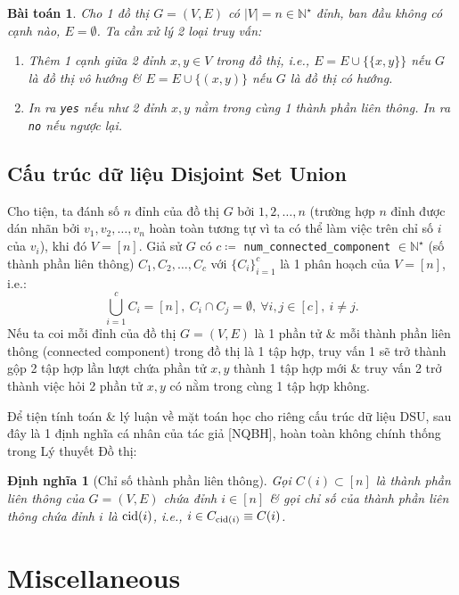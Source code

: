 \documentclass{article}
\newtheorem{baitoan}{Bài toán}
\newtheorem{dinhnghia}{Định nghĩa}
\begin{document}
\begin{baitoan}
    Cho 1 đồ thị $G = (V,E)$ có $|V| = n\in\mathbb{N}^\star$ đỉnh, ban đầu không có cạnh nào, $E = \emptyset$. Ta cần xử lý 2 loại truy vấn:
    \begin{enumerate}
        \item Thêm 1 cạnh giữa 2 đỉnh $x,y\in V$ trong đồ thị, i.e., $E = E\cup\{\{x,y\}\}$ nếu $G$ là đồ thị vô hướng \& $E = E\cup\{(x,y)\}$ nếu $G$ là đồ thị có hướng.
        \item In ra {\tt yes} nếu như 2 đỉnh $x,y$ nằm trong cùng 1 thành phần liên thông. In ra {\tt no} nếu ngược lại.
    \end{enumerate}
\end{baitoan}


\subsection{Cấu trúc dữ liệu Disjoint Set Union}
Cho tiện, ta đánh số $n$ đỉnh của đồ thị $G$ bởi $1,2,\ldots,n$ (trường hợp $n$ đỉnh được dán nhãn bởi $v_1,v_2,\ldots,v_n$ hoàn toàn tương tự vì ta có thể làm việc trên chỉ số $i$ của $v_i$), khi đó $V = [n]$. Giả sử $G$ có $c\coloneqq$ \verb|num_connected_component| $\in\mathbb{N}^\star$ (số thành phần liên thông) $C_1,C_2,\ldots,C_c$ với $\{C_i\}_{i=1}^c$ là 1 phân hoạch của $V = [n]$, i.e.:
\begin{equation*}
    \bigcup_{i=1}^c C_i = [n],\ C_i\cap C_j = \emptyset,\ \forall i,j\in[c],\ i\ne j.
\end{equation*}
Nếu ta coi mỗi đỉnh của đồ thị $G = (V,E)$ là 1 phần tử \& mỗi thành phần liên thông (connected component) trong đồ thị là 1 tập hợp, truy vấn 1 sẽ trở thành gộp 2 tập hợp lần lượt chứa phần tử $x,y$ thành 1 tập hợp mới \& truy vấn 2 trở thành việc hỏi 2 phần tử $x,y$ có nằm trong cùng 1 tập hợp không.

Để tiện tính toán \& lý luận về mặt toán học cho riêng cấu trúc dữ liệu DSU, sau đây là 1 định nghĩa cá nhân của tác giả [NQBH], hoàn toàn không chính thống trong Lý thuyết Đồ thị:

\begin{dinhnghia}[Chỉ số thành phần liên thông]
    Gọi $C(i)\subset[n]$ là thành phần liên thông của $G = (V,E)$ chứa đỉnh $i\in[n]$ \& gọi chỉ số của thành phần liên thông chứa đỉnh $i$ là ${\rm cid}(i)$, i.e., $i\in C_{{\rm cid}(i)}\equiv C(i)$.
\end{dinhnghia}


\section{Miscellaneous}


\printbibliography[heading=bibintoc]
\end{document}
